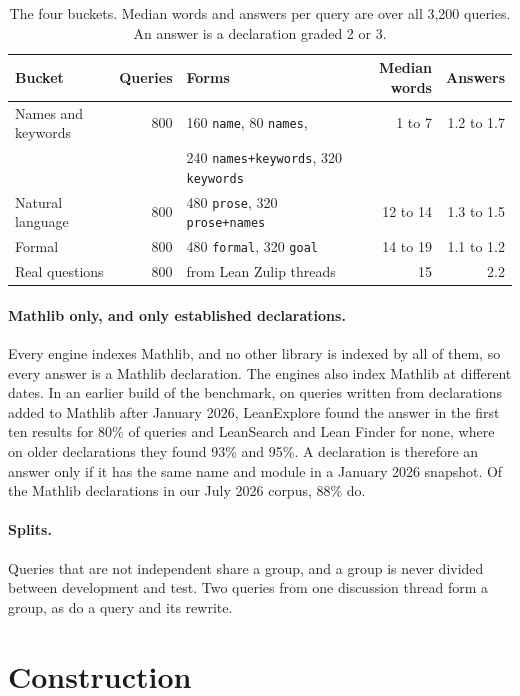 \documentclass{article}
\newcommand{\thead}[1]{\textbf{#1}}
\newcommand{\rowrule}{\arrayrulecolor{nBorderLight}\specialrule{0.4pt}{3pt}{3pt}\arrayrulecolor{nBorder}}
\newcommand{\code}[1]{\texttt{\small #1}}
\begin{document}
\begin{table}[t]
\centering\small
\caption{The four buckets. Median words and answers per query are over all
3,200 queries. An answer is a declaration graded 2 or 3.}
\label{tab:buckets}
\begin{tabular}{@{}lrlrr@{}}
\toprule
\thead{Bucket} & \thead{Queries} & \thead{Forms} & \thead{Median words} & \thead{Answers} \\
\midrule
Names and keywords & 800 & 160 \code{name}, 80 \code{names}, & 1 to 7 & 1.2 to 1.7 \\
 & & 240 \code{names+keywords}, 320 \code{keywords} & & \\
\rowrule
Natural language & 800 & 480 \code{prose}, 320 \code{prose+names} & 12 to 14 & 1.3 to 1.5 \\
\rowrule
Formal & 800 & 480 \code{formal}, 320 \code{goal} & 14 to 19 & 1.1 to 1.2 \\
\rowrule
Real questions & 800 & from Lean Zulip threads & 15 & 2.2 \\
\bottomrule
\end{tabular}
\end{table}

\paragraph{Mathlib only, and only established declarations.} Every engine
indexes Mathlib, and no other library is indexed by all of them, so every
answer is a Mathlib declaration. The engines also index Mathlib at different
dates. In an earlier build of the benchmark, on queries written from
declarations added to Mathlib after January 2026, LeanExplore found the answer
in the first ten results for 80\% of queries and LeanSearch and Lean Finder
for none, where on older declarations they found 93\% and 95\%. A declaration
is therefore an answer only if it has the same name and module in a January
2026 snapshot. Of the Mathlib declarations in our July 2026 corpus, 88\% do.

\paragraph{Splits.} Queries that are not independent share a group, and a
group is never divided between development and test. Two queries from one
discussion thread form a group, as do a query and its rewrite.

\section{Construction}
\label{sec:construction}
\end{document}
